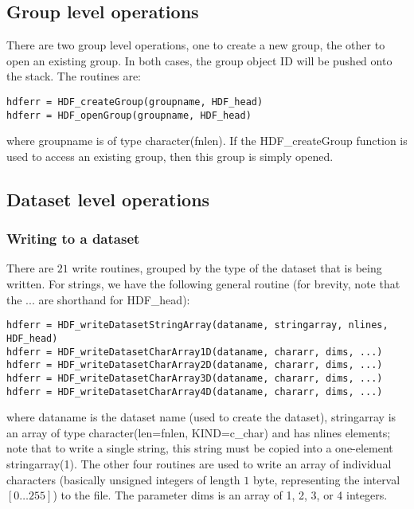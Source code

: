 \documentclass[DIV=calc, paper=letter, fontsize=11pt]{scrartcl}	 %
\begin{document}
\subsection{Group level operations}
There are two group level operations, one to create a new group, the other to open an existing group. In both cases, the group object ID will
be pushed onto the stack.  The routines are:
\begin{verbatim}
hdferr = HDF_createGroup(groupname, HDF_head)
hdferr = HDF_openGroup(groupname, HDF_head)
\end{verbatim}
where \textsf{groupname} is of type \textsf{character(fnlen)}.  If the \textsf{HDF\_createGroup}  function is used to access an existing group, then
this group is simply opened.

\subsection{Dataset level operations}


\subsubsection{Writing to a dataset}
There are $21$ write routines, grouped by the type of the dataset that is being written.
For strings, we have the following general routine (for brevity, note that the ... are shorthand for \textsf{HDF\_head}):
\begin{verbatim}
hdferr = HDF_writeDatasetStringArray(dataname, stringarray, nlines, HDF_head)
hdferr = HDF_writeDatasetCharArray1D(dataname, chararr, dims, ...)
hdferr = HDF_writeDatasetCharArray2D(dataname, chararr, dims, ...)
hdferr = HDF_writeDatasetCharArray3D(dataname, chararr, dims, ...)
hdferr = HDF_writeDatasetCharArray4D(dataname, chararr, dims, ...)
\end{verbatim}
where \textsf{dataname} is the dataset name (used to create the dataset), \textsf{stringarray} 
is an array of type \textsf{character(len=fnlen, KIND=c\_char)} and has \textsf{nlines} elements; note
that to write a single string, this string must be copied into a one-element stringarray(1). The other
four routines are used to write an array of individual characters (basically unsigned integers of length
$1$ byte, representing the interval $[0\ldots 255]$) to the file. The parameter \textsf{dims} is an array 
of 1, 2, 3, or 4 integers.
\end{document}
